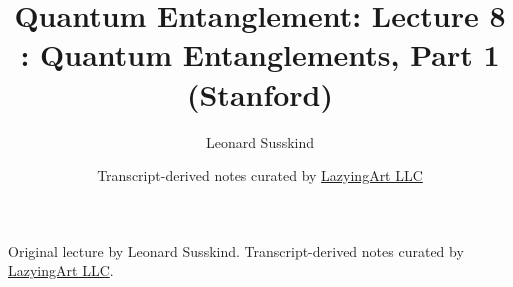 \documentclass[11pt,oneside]{book}
\begin{document}
\frontmatter
\title{Quantum Entanglement: Lecture 8 : Quantum Entanglements, Part 1 (Stanford)}
\author{Leonard Susskind}
\date{Transcript-derived notes curated by \href{https://lazying.art}{LazyingArt LLC}}
\maketitle
\begin{center}
\small Original lecture by Leonard Susskind. Transcript-derived notes curated by \href{https://lazying.art}{LazyingArt LLC}.
\end{center}
\clearpage
\mainmatter

\end{document}
